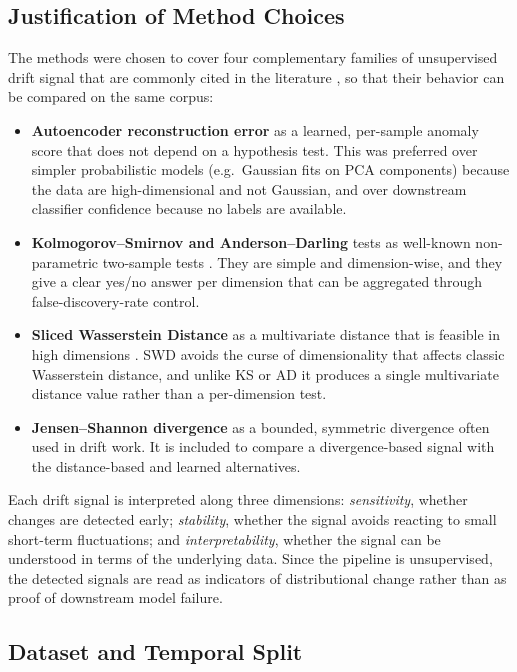 \documentclass[conference]{IEEEtran}
\begin{document}
\subsection{Justification of Method Choices}

The methods were chosen to cover four complementary families of unsupervised drift signal that are commonly cited in the literature \cite{lu2018,abghani2020,bayram2022}, so that their behavior can be compared on the same corpus:

\begin{itemize}
\item \textbf{Autoencoder reconstruction error} as a learned, per-sample anomaly score that does not depend on a hypothesis test. This was preferred over simpler probabilistic models (e.g.\ Gaussian fits on PCA components) because the data are high-dimensional and not Gaussian, and over downstream classifier confidence because no labels are available.
\item \textbf{Kolmogorov--Smirnov and Anderson--Darling} tests as well-known non-parametric two-sample tests \cite{abghani2020}. They are simple and dimension-wise, and they give a clear yes/no answer per dimension that can be aggregated through false-discovery-rate control.
\item \textbf{Sliced Wasserstein Distance} as a multivariate distance that is feasible in high dimensions \cite{bonneel2015}. SWD avoids the curse of dimensionality that affects classic Wasserstein distance, and unlike KS or AD it produces a single multivariate distance value rather than a per-dimension test.
\item \textbf{Jensen--Shannon divergence} as a bounded, symmetric divergence often used in drift work. It is included to compare a divergence-based signal with the distance-based and learned alternatives.
\end{itemize}

Each drift signal is interpreted along three dimensions: \emph{sensitivity}, whether changes are detected early; \emph{stability}, whether the signal avoids reacting to small short-term fluctuations; and \emph{interpretability}, whether the signal can be understood in terms of the underlying data. Since the pipeline is unsupervised, the detected signals are read as indicators of distributional change rather than as proof of downstream model failure.

\subsection{Dataset and Temporal Split}
\label{sec:experimental}
\end{document}
